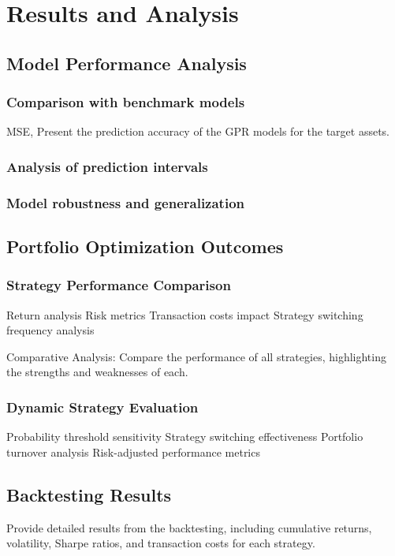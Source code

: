 
\chapter{Results and Analysis}\label{chapter:results and analysis}

\section{Model Performance Analysis}

\subsection{Comparison with benchmark models}
MSE, Present the prediction accuracy of the GPR models for the target assets.

\subsection{Analysis of prediction intervals}

\subsection{Model robustness and generalization}

\section{Portfolio Optimization Outcomes}

\subsection{Strategy Performance Comparison}
Return analysis
Risk metrics
Transaction costs impact
Strategy switching frequency analysis


Comparative Analysis:
Compare the performance of all strategies, highlighting the strengths and weaknesses of each.

\subsection{Dynamic Strategy Evaluation}
Probability threshold sensitivity
Strategy switching effectiveness
Portfolio turnover analysis
Risk-adjusted performance metrics

\section{Backtesting Results}
Provide detailed results from the backtesting, including cumulative returns, volatility, Sharpe ratios, and transaction costs for each strategy.

